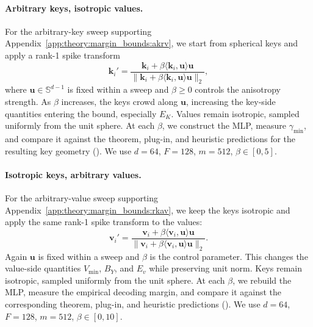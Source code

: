 \paragraph{Arbitrary keys, isotropic values.}
\label{app:exp:section4:anisotropic-keys}
For the arbitrary-key sweep supporting Appendix~\ref{app:theory:margin_bounds:akrv}, we start from spherical keys and apply a rank-1 spike transform
\[
\mathbf{k}_{i}'
=
\frac{\mathbf{k}_{i} + \beta \langle \mathbf{k}_{i}, \mathbf{u}\rangle \mathbf{u}}
{\|\mathbf{k}_{i} + \beta \langle \mathbf{k}_{i}, \mathbf{u}\rangle \mathbf{u}\|_2},
\]
where $\mathbf{u}\in\mathbb{S}^{d-1}$ is fixed within a sweep and $\beta\ge 0$ controls the anisotropy strength.
As $\beta$ increases, the keys crowd along $\mathbf{u}$, increasing the key-side quantities entering the bound, especially $E_{K}$.
Values remain isotropic, sampled uniformly from the unit sphere.
At each $\beta$, we construct the MLP, measure $\gamma_{\min}$, and compare it against the theorem, plug-in, and heuristic predictions for the resulting key geometry ().
We use $d=64$, $F=128$, $m=512$, $\beta\in[0,5]$.

\paragraph{Isotropic keys, arbitrary values.}
\label{app:exp:section4:anisotropic-values}
For the arbitrary-value sweep supporting Appendix~\ref{app:theory:margin_bounds:rkav}, we keep the keys isotropic and apply the same rank-1 spike transform to the values:
\[
\mathbf{v}_{i}'
=
\frac{\mathbf{v}_{i} + \beta \langle \mathbf{v}_{i}, \mathbf{u}\rangle \mathbf{u}}
{\|\mathbf{v}_{i} + \beta \langle \mathbf{v}_{i}, \mathbf{u}\rangle \mathbf{u}\|_2}.
\]
Again $\mathbf{u}$ is fixed within a sweep and $\beta$ is the control parameter. This changes the value-side quantities $V_{\min}$, $B_{Y}$, and $E_{v}$ while preserving unit norm.
Keys remain isotropic, sampled uniformly from the unit sphere.
At each $\beta$, we rebuild the MLP, measure the empirical decoding margin, and compare it against the corresponding theorem, plug-in, and heuristic predictions ().
We use $d=64$, $F=128$, $m=512$, $\beta\in[0,10]$.

